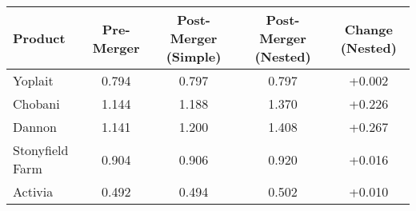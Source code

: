 \begin{tabular}{lcccc}
\hline
Product & Pre-Merger & Post-Merger (Simple) & Post-Merger (Nested) & Change (Nested) \\
\hline
Yoplait & 0.794 & 0.797 & 0.797 & +0.002 \\
Chobani & 1.144 & 1.188 & 1.370 & +0.226 \\
Dannon & 1.141 & 1.200 & 1.408 & +0.267 \\
Stonyfield Farm & 0.904 & 0.906 & 0.920 & +0.016 \\
Activia & 0.492 & 0.494 & 0.502 & +0.010 \\
\hline
\end{tabular}